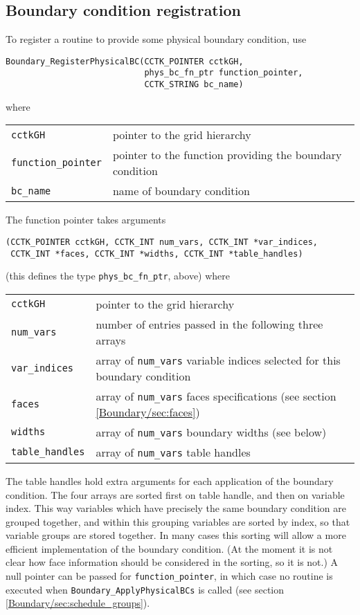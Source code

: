 \documentclass{article}
\begin{document}
\subsection{Boundary condition registration}
\label{Boundary/sec:bc_registration}

To register a routine to provide some physical boundary condition, use
\begin{verbatim}
Boundary_RegisterPhysicalBC(CCTK_POINTER cctkGH, 
                            phys_bc_fn_ptr function_pointer, 
                            CCTK_STRING bc_name)
\end{verbatim}
where

\begin{tabular}{ll}
\texttt{cctkGH} & pointer to the grid hierarchy\\
\texttt{function\_pointer} & pointer to the function providing the
boundary condition\\
\texttt{bc\_name} & name of boundary condition
\end{tabular}

The function pointer takes arguments
\begin{verbatim}
(CCTK_POINTER cctkGH, CCTK_INT num_vars, CCTK_INT *var_indices, 
 CCTK_INT *faces, CCTK_INT *widths, CCTK_INT *table_handles)
\end{verbatim}
(this defines the type \texttt{phys\_bc\_fn\_ptr}, above) where

\begin{tabular}{ll}
\texttt{cctkGH} & pointer to the grid hierarchy\\
\texttt{num\_vars} & number of entries passed in the following three arrays\\
\texttt{var\_indices} & array of \texttt{num\_vars} variable indices selected for this boundary condition\\
\texttt{faces} & array of \texttt{num\_vars} faces specifications
(see section \ref{Boundary/sec:faces})\\
\texttt{widths} & array of \texttt{num\_vars} boundary widths (see below)\\
\texttt{table\_handles} & array of \texttt{num\_vars} table handles%
\end{tabular}

The table handles hold extra arguments for each application of the boundary condition.
The four arrays are sorted first on table handle, and then on
variable index.  This way variables which have precisely the same
boundary condition are grouped together, and within this grouping
variables are sorted by index, so that variable groups are stored
together.  In many cases this sorting will allow a more efficient
implementation of the boundary condition.  (At the moment it is not
clear how face information should be considered in the sorting, so it
is not.)  A null pointer can be passed for \texttt{function\_pointer},
in which case no routine is executed when
\texttt{Boundary\_ApplyPhysicalBCs} is called (see section
\ref{Boundary/sec:schedule_groups}).
\end{document}
